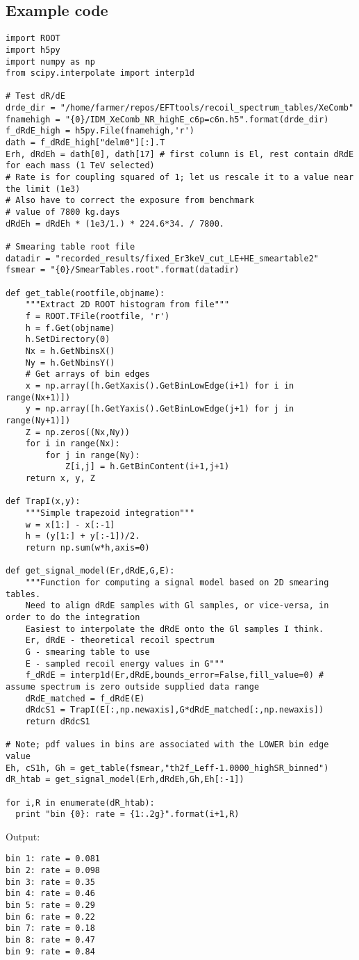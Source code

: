\subsection{Example code}
\label{app:example_code}
\begin{lstlisting}
import ROOT
import h5py
import numpy as np
from scipy.interpolate import interp1d

# Test dR/dE
drde_dir = "/home/farmer/repos/EFTtools/recoil_spectrum_tables/XeComb"
fnamehigh = "{0}/IDM_XeComb_NR_highE_c6p=c6n.h5".format(drde_dir)
f_dRdE_high = h5py.File(fnamehigh,'r')
dath = f_dRdE_high["delm0"][:].T
Erh, dRdEh = dath[0], dath[17] # first column is El, rest contain dRdE for each mass (1 TeV selected)
# Rate is for coupling squared of 1; let us rescale it to a value near the limit (1e3)
# Also have to correct the exposure from benchmark
# value of 7800 kg.days
dRdEh = dRdEh * (1e3/1.) * 224.6*34. / 7800.

# Smearing table root file
datadir = "recorded_results/fixed_Er3keV_cut_LE+HE_smeartable2"
fsmear = "{0}/SmearTables.root".format(datadir)

def get_table(rootfile,objname):
    """Extract 2D ROOT histogram from file""" 
    f = ROOT.TFile(rootfile, 'r')
    h = f.Get(objname)
    h.SetDirectory(0)
    Nx = h.GetNbinsX()
    Ny = h.GetNbinsY()
    # Get arrays of bin edges
    x = np.array([h.GetXaxis().GetBinLowEdge(i+1) for i in range(Nx+1)])
    y = np.array([h.GetYaxis().GetBinLowEdge(j+1) for j in range(Ny+1)])
    Z = np.zeros((Nx,Ny))
    for i in range(Nx):
        for j in range(Ny):
            Z[i,j] = h.GetBinContent(i+1,j+1)
    return x, y, Z

def TrapI(x,y):
    """Simple trapezoid integration"""
    w = x[1:] - x[:-1]
    h = (y[1:] + y[:-1])/2.
    return np.sum(w*h,axis=0)

def get_signal_model(Er,dRdE,G,E):
    """Function for computing a signal model based on 2D smearing tables.
    Need to align dRdE samples with Gl samples, or vice-versa, in order to do the integration
    Easiest to interpolate the dRdE onto the Gl samples I think.
    Er, dRdE - theoretical recoil spectrum
    G - smearing table to use
    E - sampled recoil energy values in G"""
    f_dRdE = interp1d(Er,dRdE,bounds_error=False,fill_value=0) # assume spectrum is zero outside supplied data range
    dRdE_matched = f_dRdE(E)
    dRdcS1 = TrapI(E[:,np.newaxis],G*dRdE_matched[:,np.newaxis])
    return dRdcS1

# Note; pdf values in bins are associated with the LOWER bin edge value
Eh, cS1h, Gh = get_table(fsmear,"th2f_Leff-1.0000_highSR_binned")
dR_htab = get_signal_model(Erh,dRdEh,Gh,Eh[:-1]) 

for i,R in enumerate(dR_htab):
  print "bin {0}: rate = {1:.2g}".format(i+1,R)
\end{lstlisting}

Output:

\begin{lstlisting}
bin 1: rate = 0.081
bin 2: rate = 0.098
bin 3: rate = 0.35
bin 4: rate = 0.46
bin 5: rate = 0.29
bin 6: rate = 0.22
bin 7: rate = 0.18
bin 8: rate = 0.47
bin 9: rate = 0.84
\end{lstlisting}
